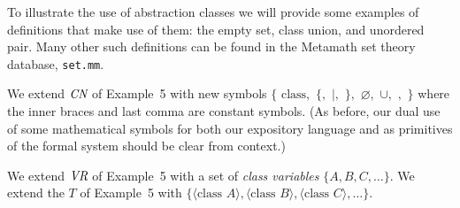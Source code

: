 To illustrate the use of abstraction classes we will provide some examples
of definitions that make use of them:  the empty set, class union, and
unordered pair.  Many other such definitions can be found in the
Metamath set theory database,
\texttt{set.mm}.

We extend $\mbox{\em CN}$ of Example~5 with new symbols $\{$
$\mbox{class},$ $\{,$ $|,$ $\},$ $\varnothing,$ $\cup,$ $,$ $\}$
where the inner braces and last comma are
constant symbols. (As before,
our dual use of some mathematical symbols for both our expository
language and as primitives of the formal system should be clear from context.)

We extend $\mbox{\em VR}$ of Example~5 with a set of {\em class
variables}
$\{A,B,C,\ldots\}$. We extend the $T$ of Example~5 with $\{\langle
\mbox{class\ } A\rangle, \langle \mbox{class\ }B\rangle, \langle \mbox{class\ }
C\rangle,\ldots\}$.

